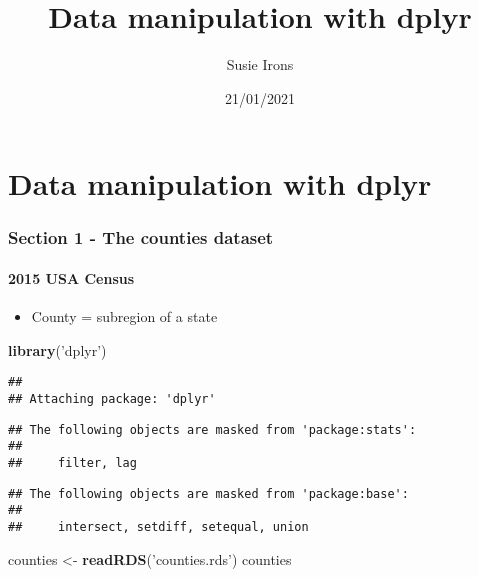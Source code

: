 \documentclass[
]{article}
\title{Data manipulation with dplyr}
\author{Susie Irons}
\date{21/01/2021}
\newenvironment{Shaded}{\begin{snugshade}}{\end{snugshade}}
\newcommand{\KeywordTok}[1]{\textcolor[rgb]{0.13,0.29,0.53}{\textbf{#1}}}
\newcommand{\NormalTok}[1]{#1}
\newcommand{\StringTok}[1]{\textcolor[rgb]{0.31,0.60,0.02}{#1}}
\providecommand{\tightlist}{%
  \setlength{\itemsep}{0pt}\setlength{\parskip}{0pt}}
\begin{document}
\maketitle

\hypertarget{data-manipulation-with-dplyr}{%
\section{Data manipulation with
dplyr}\label{data-manipulation-with-dplyr}}

\hypertarget{section-1---the-counties-dataset}{%
\subsubsection{Section 1 - The counties
dataset}\label{section-1---the-counties-dataset}}

\hypertarget{usa-census}{%
\paragraph{2015 USA Census}\label{usa-census}}

\begin{itemize}
\tightlist
\item
  County = subregion of a state
\end{itemize}

\begin{Shaded}
\begin{Highlighting}[]
\KeywordTok{library}\NormalTok{(}\StringTok{'dplyr'}\NormalTok{)}
\end{Highlighting}
\end{Shaded}

\begin{verbatim}
## 
## Attaching package: 'dplyr'
\end{verbatim}

\begin{verbatim}
## The following objects are masked from 'package:stats':
## 
##     filter, lag
\end{verbatim}

\begin{verbatim}
## The following objects are masked from 'package:base':
## 
##     intersect, setdiff, setequal, union
\end{verbatim}

\begin{Shaded}
\begin{Highlighting}[]
\NormalTok{counties <-}\StringTok{ }\KeywordTok{readRDS}\NormalTok{(}\StringTok{'counties.rds'}\NormalTok{)}
\NormalTok{counties}
\end{Highlighting}
\end{Shaded}
\end{document}
